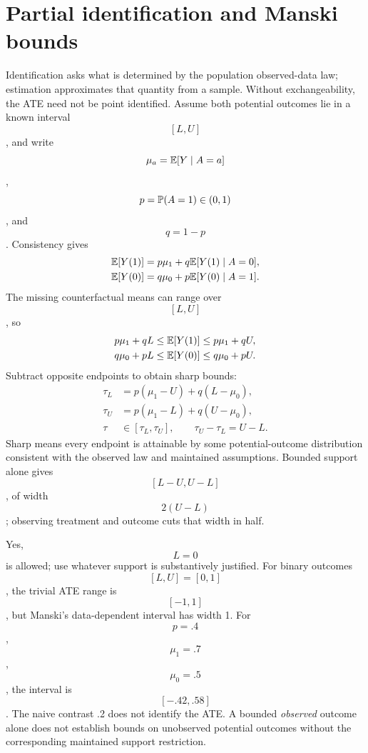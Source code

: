\section{Partial identification and Manski bounds}
Identification asks what is determined by the population observed-data law; estimation approximates that quantity from a sample. Without exchangeability, the ATE need not be point identified. Assume both potential outcomes lie in a known interval $$[L,U]$$, and write $$\mu_a=\mathbb E[Y\mid A=a]$$, $$p=\mathbb P(A=1)\in(0,1)$$, and $$q=1-p$$. Consistency gives
\begin{align}
\mathbb E[Y(1)]&=p\mu_1+q\mathbb E[Y(1)\mid A=0],\\
\mathbb E[Y(0)]&=q\mu_0+p\mathbb E[Y(0)\mid A=1].
\end{align}
The missing counterfactual means can range over $$[L,U]$$, so
\begin{align}
p\mu_1+qL&\leq\mathbb E[Y(1)]\leq p\mu_1+qU,\\
q\mu_0+pL&\leq\mathbb E[Y(0)]\leq q\mu_0+pU.
\end{align}
Subtract opposite endpoints to obtain sharp bounds:
\begin{align}
\tau_L&=p(\mu_1-U)+q(L-\mu_0),\\
\tau_U&=p(\mu_1-L)+q(U-\mu_0),\\
\tau&\in[\tau_L,\tau_U],\qquad \tau_U-\tau_L=U-L.
\end{align}
Sharp means every endpoint is attainable by some potential-outcome distribution consistent with the observed law and maintained assumptions. Bounded support alone gives $$[L-U,U-L]$$, of width $$2(U-L)$$; observing treatment and outcome cuts that width in half.
\begin{remarkbox}
Yes, $$L=0$$ is allowed; use whatever support is substantively justified. For binary outcomes $$[L,U]=[0,1]$$, the trivial ATE range is $$[-1,1]$$, but Manski's data-dependent interval has width 1. For $$p=.4$$, $$\mu_1=.7$$, $$\mu_0=.5$$, the interval is $$[-.42,.58]$$. The naive contrast .2 does not identify the ATE. A bounded \emph{observed} outcome alone does not establish bounds on unobserved potential outcomes without the corresponding maintained support restriction.
\end{remarkbox}

